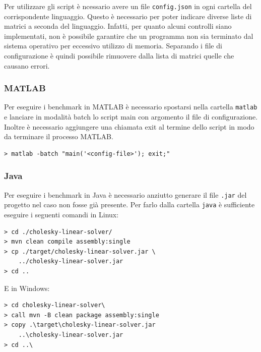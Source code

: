 \documentclass[a4paper, 12pt]{article}
\begin{document}
            Per utilizzare gli script è ncessario avere un file 
            \texttt{config.json} in ogni cartella del corrispondente linguaggio.
            Questo è necessario per poter indicare diverse liste di matrici a 
            seconda del linguaggio. Infatti, per quanto alcuni controlli siano 
            implementati, non è possibile garantire che un programma non sia 
            terminato dal sistema operativo per eccessivo utilizzo di memoria.
            Separando i file di configurazione è quindi possibile rimuovere 
            dalla lista di matrici quelle che causano errori.

            \subsubsection{MATLAB}
                Per eseguire i benchmark in MATLAB è necessario spostarsi nella
                cartella \texttt{matlab} e lanciare in modalità batch lo script
                main con argomento il file di configurazione. Inoltre è
                necessario aggiungere una chiamata exit al termine dello script
                in modo da terminare il processo MATLAB.

\begin{lstlisting}[frame=single]
> matlab -batch "main('<config-file>'); exit;"
\end{lstlisting}

            \subsubsection{Java}
            Per eseguire i benchmark in Java è necessario anziutto generare il
            file \texttt{.jar} del progetto nel caso non fosse già presente.
            Per farlo dalla cartella \texttt{java} è sufficiente eseguire i
            seguenti comandi in Linux:

\begin{lstlisting}[frame=single]
> cd ./cholesky-linear-solver/
> mvn clean compile assembly:single
> cp ./target/cholesky-linear-solver.jar \
    ../cholesky-linear-solver.jar
> cd ..
\end{lstlisting}

            E in Windows:

\begin{lstlisting}[frame=single]
> cd cholesky-linear-solver\
> call mvn -B clean package assembly:single
> copy .\target\cholesky-linear-solver.jar 
    ..\cholesky-linear-solver.jar
> cd ..\
\end{lstlisting}
\end{document}
